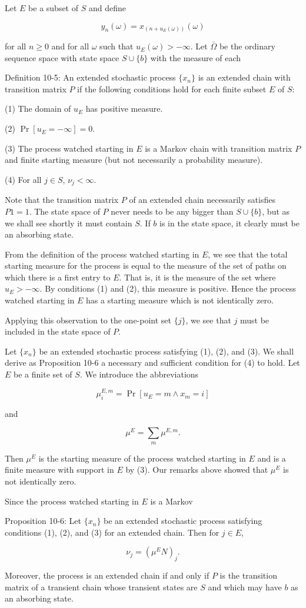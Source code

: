 Let $E$ be a subset of $S$ and define

$$y_n(\omega) = x_{(n+u_E(\omega))}(\omega)$$

for all $n \geq 0$ and for all $\omega$ such that $u_E(\omega) > -\infty$. Let $\bar{\Omega}$ be the ordinary sequence space with state space $S \cup \{b\}$ with the measure of each

Definition 10-5: An extended stochastic process $\{x_n\}$ is an extended chain with transition matrix $P$ if the following conditions hold for each finite subset $E$ of $S$:

(1) The domain of $u_E$ has positive measure.

(2) $\Pr[u_E = -\infty] = 0$.

(3) The process watched starting in $E$ is a Markov chain with transition matrix $P$ and finite starting measure (but not necessarily a probability measure).

(4) For all $j \in S$, $\nu_j < \infty$.

Note that the transition matrix $P$ of an extended chain necessarily satisfies $P1 = 1$. The state space of $P$ never needs to be any bigger than $S \cup \{b\}$, but as we shall see shortly it must contain $S$. If $b$ is in the state space, it clearly must be an absorbing state.

From the definition of the process watched starting in $E$, we see that the total starting measure for the process is equal to the measure of the set of paths on which there is a first entry to $E$. That is, it is the measure of the set where $u_E > -\infty$. By conditions (1) and (2), this measure is positive. Hence the process watched starting in $E$ has a starting measure which is not identically zero.

Applying this observation to the one-point set $\{j\}$, we see that $j$ must be included in the state space of $P$.

Let $\{x_n\}$ be an extended stochastic process satisfying (1), (2), and (3). We shall derive as Proposition 10-6 a necessary and sufficient condition for (4) to hold. Let $E$ be a finite set of $S$. We introduce the abbreviations

$$\mu_i^{E,m} = \Pr[u_E = m \wedge x_m = i]$$

and

$$\mu^E = \sum_m \mu^{E,m}.$$

Then $\mu^E$ is the starting measure of the process watched starting in $E$ and is a finite measure with support in $E$ by (3). Our remarks above showed that $\mu^E$ is not identically zero.

Since the process watched starting in $E$ is a Markov

Proposition 10-6: Let $\{x_n\}$ be an extended stochastic process satisfying conditions (1), (2), and (3) for an extended chain. Then for $j \in E$,

$$\nu_j = (\mu^E N)_j.$$

Moreover, the process is an extended chain if and only if $P$ is the transition matrix of a transient chain whose transient states are $S$ and which may have $b$ as an absorbing state.
